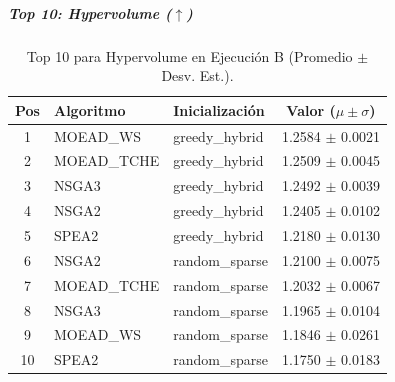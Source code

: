 \subparagraph{Top 10: Hypervolume ($\uparrow$)}
\begin{table}[H]
    \centering
    \begin{tabular}{cllc}
        \toprule
        Pos & Algoritmo & Inicialización & Valor ($\mu \pm \sigma$) \\
        \midrule
        1 & MOEAD\_WS & greedy\_hybrid & 1.2584 $\pm$ 0.0021 \\
        2 & MOEAD\_TCHE & greedy\_hybrid & 1.2509 $\pm$ 0.0045 \\
        3 & NSGA3 & greedy\_hybrid & 1.2492 $\pm$ 0.0039 \\
        4 & NSGA2 & greedy\_hybrid & 1.2405 $\pm$ 0.0102 \\
        5 & SPEA2 & greedy\_hybrid & 1.2180 $\pm$ 0.0130 \\
        6 & NSGA2 & random\_sparse & 1.2100 $\pm$ 0.0075 \\
        7 & MOEAD\_TCHE & random\_sparse & 1.2032 $\pm$ 0.0067 \\
        8 & NSGA3 & random\_sparse & 1.1965 $\pm$ 0.0104 \\
        9 & MOEAD\_WS & random\_sparse & 1.1846 $\pm$ 0.0261 \\
        10 & SPEA2 & random\_sparse & 1.1750 $\pm$ 0.0183 \\
        \bottomrule
    \end{tabular}
    \caption{Top 10 para Hypervolume en Ejecución B (Promedio $\pm$ Desv. Est.).}
\end{table}

